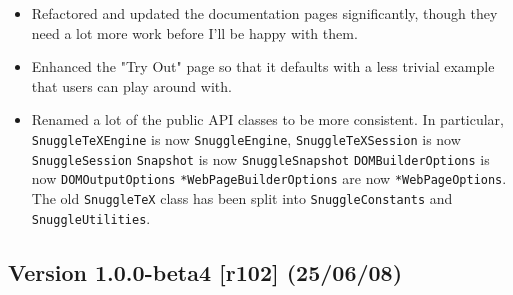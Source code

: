 \begin{itemize}
  \item Refactored and updated the documentation pages significantly, though
  they need a lot more work before I'll be happy with them.

  \item Enhanced the "Try Out" page so that it defaults with a less trivial
  example that users can play around with.

  \item Renamed a lot of the public API classes to be more consistent. In
  particular, \verb|SnuggleTeXEngine| is now \verb|SnuggleEngine|,
  \verb|SnuggleTeXSession| is now \verb|SnuggleSession|
  \verb|Snapshot| is now \verb|SnuggleSnapshot|
  \verb|DOMBuilderOptions| is now \verb|DOMOutputOptions|
  \verb|*WebPageBuilderOptions| are now \verb|*WebPageOptions|.
  The old \verb|SnuggleTeX| class has been split into \verb|SnuggleConstants|
  and \verb|SnuggleUtilities|.

\end{itemize}

\subsection*{Version 1.0.0-beta4 [r102] (25/06/08)}

